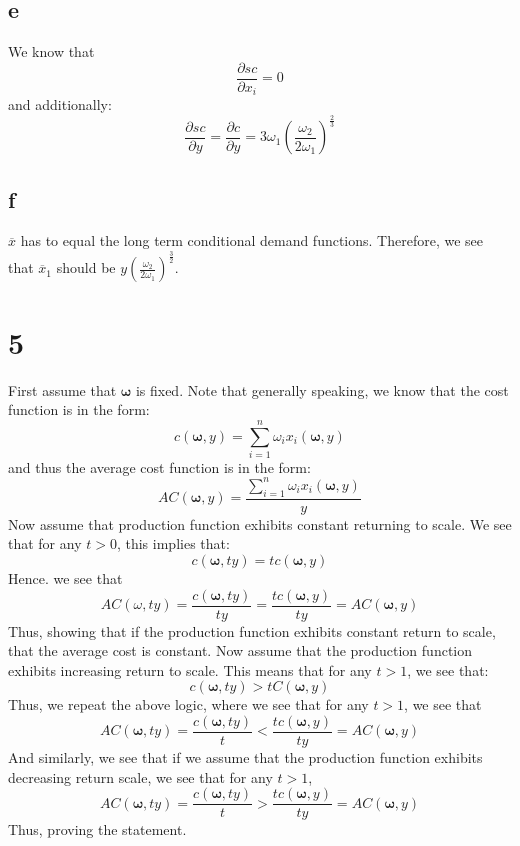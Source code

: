 \documentclass[11pt]{article}
\begin{document}
\subsection*{e}
We know that 
\[
\frac{\partial sc}{\partial x_i} = 0
\]
and additionally:
\[
\frac{\partial sc}{\partial y} = \frac{\partial c}{\partial y} = 3 \omega_1 \left( \frac{\omega_2}{2\omega_1} \right)^\frac{2}{3}
\]
\subsection*{f}
$\overline{x}$ has to equal the long term conditional demand functions. Therefore, we see that $\overline{x}_1$ should be $y \left( \frac{\omega_2}{2\omega_1} \right)^\frac{3}{2}$.
\section*{5}
First assume that $\mathbf{\omega}$ is fixed. Note that generally speaking, we know that the cost function is in the form:
\[
c(\mathbf{\omega}, y) = \sum_{i=1}^n \omega_i x_i(\mathbf{\omega}, y) 
\]
and thus the average cost function is in the form:
\[
AC(\mathbf{\omega}, y) = \frac{\sum_{i = 1}^n \omega_i x_i(\mathbf{\omega}, y)}{y}
\]
Now assume that production function exhibits constant returning to scale. We see that for any $t > 0$, this implies that:
\[
c(\mathbf{\omega}, ty) = tc(\mathbf{\omega}, y)
\]
Hence. we see that 
\[
AC(\omega, ty) = \frac{c(\mathbf{\omega}, ty)}{ty} = \frac{tc(\mathbf{\omega}, y)}{ty} = AC(\mathbf{\omega}, y) 
\]
Thus, showing that if the production function exhibits constant return to scale, that the average cost is constant. Now assume that the production function exhibits increasing return to scale. This means that for any $t > 1$, we see that:
\[
c(\mathbf{\omega}, ty) > tC(\mathbf{\omega}, y) 
\]
Thus, we repeat the above logic, where we see that for any $t> 1$, we see that 
\[
AC(\mathbf{\omega}, ty) = \frac{c(\mathbf{\omega}, ty)}{t} < \frac{tc(\mathbf{\omega}, y)}{ty} = AC(\mathbf{\omega}, y)
\]
And similarly, we see that if we assume that the production function exhibits decreasing return scale, we see that for any $t > 1$, 
\[
AC(\mathbf{\omega}, ty) = \frac{c(\mathbf{\omega}, ty)}{t} > \frac{tc(\mathbf{\omega}, y)}{ty} = AC(\mathbf{\omega}, y)
\]
Thus, proving the statement. 
\end{document}
